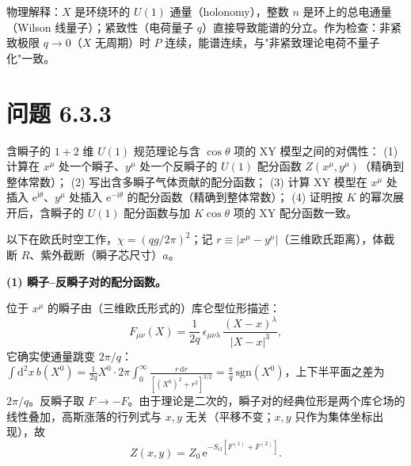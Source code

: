 物理解释：$X$ 是环绕环的 $U(1)$ 通量（holonomy），整数 $n$ 是环上的总电通量（Wilson 线量子）；紧致性（电荷量子 $q$）直接导致能谱的分立。作为检查：非紧致极限 $q\to0$（$X$ 无周期）时 $P$ 连续，能谱连续，与"非紧致理论电荷不量子化"一致。

\section*{问题 6.3.3}
\begin{problem}
含瞬子的 $1+2$ 维 $U(1)$ 规范理论与含 $\cos\theta$ 项的 XY 模型之间的对偶性：
(1) 计算在 $x^\mu$ 处一个瞬子、$y^\mu$ 处一个反瞬子的 $U(1)$ 配分函数 $Z(x^\mu,y^\mu)$（精确到整体常数）；
(2) 写出含多瞬子气体贡献的配分函数；
(3) 计算 XY 模型在 $x^\mu$ 处插入 $\mathrm{e}^{\mathrm{i}\theta}$、$y^\mu$ 处插入 $\mathrm{e}^{-\mathrm{i}\theta}$ 的配分函数（精确到整体常数）；
(4) 证明按 $K$ 的幂次展开后，含瞬子的 $U(1)$ 配分函数与加 $K\cos\theta$ 项的 XY 配分函数一致。
\end{problem}
\solution

以下在欧氏时空工作，$\chi=(qg/2\pi)^{2}$；记 $r\equiv|x^\mu-y^\mu|$（三维欧氏距离），体截断 $R$、紫外截断（瞬子芯尺寸）$a$。

\textbf{(1) 瞬子--反瞬子对的配分函数。}

位于 $x^\mu$ 的瞬子由（三维欧氏形式的）库仑型位形描述：
\begin{equation*}
F_{\mu\nu}(X)=\frac{1}{2q}\,\epsilon_{\mu\nu\lambda}\,\frac{(X-x)^\lambda}{|X-x|^{3}} ,
\end{equation*}
它确实使通量跳变 $2\pi/q$：$\int\mathrm{d}^2x\,b(X^0)=\frac{1}{2q}X^0\cdot2\pi\int_0^\infty\frac{r\,\mathrm{d}r}{[(X^0)^2+r^2]^{3/2}}=\frac{\pi}{q}\,\mathrm{sgn}(X^0)$，上下半平面之差为 $2\pi/q$。反瞬子取 $F\to-F$。由于理论是二次的，瞬子对的经典位形是两个库仑场的线性叠加，高斯涨落的行列式与 $x,y$ 无关（平移不变；$x,y$ 只作为集体坐标出现），故
\begin{equation*}
Z(x,y)=Z_0\,\mathrm{e}^{-S_{\text{cl}}[F^{(1)}+F^{(2)}]} .
\end{equation*}

